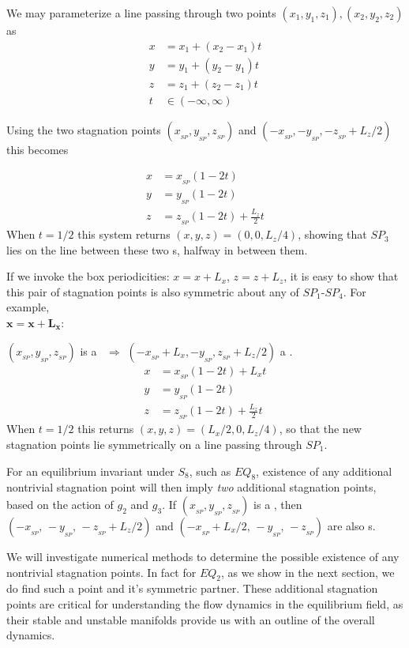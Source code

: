 \documentclass[letter,12pt,openany]{article}
\begin{document}
 \noindent We may parameterize a line passing through two points $(x_{1}, y_{1}, z_{1}),(x_{2}, y_{2}, z_{2})$
 as
 \begin{align}
  x &= x_{1} + (x_{2} - x_{1})t \\
  y &= y_{1} + (y_{2} - y_{1})t \\
  z &= z_{1} + (z_{2} - z_{1})t \\
  t &\in (-\infty,\infty)
 \end{align}
 
 Using the two stagnation points $(x_{_{SP}},y_{_{SP}},z_{_{SP}})$ and $(-x_{_{SP}},-y_{_{SP}},-z_{_{SP}} + L_z/2)$ this becomes
 
 \begin{align}
  x &= x_{_{SP}}(1-2t) \\
  y &= y_{_{SP}}(1-2t) \\
  z &= z_{_{SP}}(1-2t) + \frac{L_{z}}{2} t
 \end{align}
 When $t = 1/2$ this system returns $(x,y,z) = (0,0,L_{z}/4)$, showing
 that $SP_3$ lies on the line between these two \stagp s, halfway
 in between them.

 If we invoke the box periodicities: $x = x + L_{x}$, $z = z +
 L_{z}$, it is easy to show that this pair of stagnation points is also symmetric
 about any of $SP_1$-$SP_4$. For example, \\

 \noindent$\mathbf{x = x + L_{x}}$:

 \noindent $(x_{_{SP}},y_{_{SP}},z_{_{SP}})$ is a \stagp\ $\Rightarrow$
 $(-x_{_{SP}}+L_{x},-y_{_{SP}},z_{_{SP}}+L_{z}/2)$ a \stagp.
 \begin{align}
  x &= x_{_{SP}}(1-2t) + L_{x}t \\
  y &= y_{_{SP}}(1-2t) \\
  z &= z_{_{SP}}(1-2t) + \frac{L_{z}}{2} t
 \end{align}
 When $t = 1/2$ this returns $(x,y,z) = (L_{x}/2,0,L_{z}/4)$, so that the new stagnation
 points lie symmetrically on a line passing through $SP_1$. 

 For an equilibrium invariant under $S_8$, such as $EQ_8$, existence of any additional nontrivial stagnation point will then imply \textit{two} additional stagnation points, based on the action of $g_2$ and $g_3$.
 If $(x_{_{SP}},y_{_{SP}},z_{_{SP}})$ is a \stagp, then  $(-x_{_{SP}},\, -y_{_{SP}},\, -z_{_{SP}}+L_z/2)$ and $(-x_{_{SP}} + L_x/2,\, -y_{_{SP}},\, -z_{_{SP}})$ are also \stagp s. 

 We will investigate numerical methods to determine the possible existence of any nontrivial stagnation points. In fact for $EQ_2$, as we show in the next section, we do find such a point and it's symmetric partner. These additional stagnation points are critical for understanding the flow dynamics in the equilibrium field, as their stable and unstable manifolds provide us with an outline of the overall dynamics.
 
\end{document}

